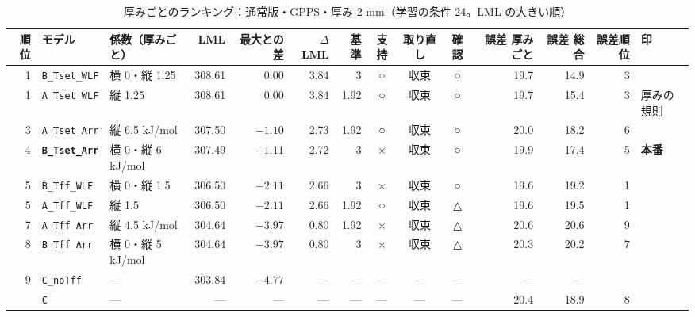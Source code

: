 \documentclass[paper=a4paper,landscape,fontsize=10pt,line_length=62zw,number_of_lines=34]{jlreq}
\let\origtextbf\textbf
\renewcommand{\textbf}[1]{\origtextbf{\gtfamily #1}}   %
\begin{document}
\begin{table}[H]\centering\footnotesize
\caption{厚みごとのランキング：通常版・GPPS・厚み 2 mm（学習の条件 24。LML の大きい順）}
\begin{tabular}{rlp{11\zw}rrrrccc rrrl}
\toprule
順位 & モデル & 係数（厚みごと） & LML & 最大との差 & $\Delta$LML & 基準 & 支持 & 取り直し & 確認 & 誤差 厚みごと & 誤差 総合 & 誤差順位 & 印 \\
\midrule
1 & \texttt{B\_\allowbreak{}Tset\_\allowbreak{}WLF} & 横 0・縦 1.25 & 308.61 & 0.00 & 3.84 & 3 & ○ & 収束 & ○ & 19.7 & 14.9 & 3 &  \\
1 & \texttt{A\_\allowbreak{}Tset\_\allowbreak{}WLF} & 縦 1.25 & 308.61 & 0.00 & 3.84 & 1.92 & ○ & 収束 & ○ & 19.7 & 15.4 & 3 & 厚みの規則 \\
3 & \texttt{A\_\allowbreak{}Tset\_\allowbreak{}Arr} & 縦 6.5 kJ/mol & 307.50 & $-1.10$ & 2.73 & 1.92 & ○ & 収束 & ○ & 20.0 & 18.2 & 6 &  \\
4 & \textbf{\texttt{B\_\allowbreak{}Tset\_\allowbreak{}Arr}} & 横 0・縦 6 kJ/mol & 307.49 & $-1.11$ & 2.72 & 3 & × & 収束 & ○ & 19.9 & 17.4 & 5 & \textbf{本番} \\
5 & \texttt{B\_\allowbreak{}Tff\_\allowbreak{}WLF} & 横 0・縦 1.5 & 306.50 & $-2.11$ & 2.66 & 3 & × & 収束 & ○ & 19.6 & 19.2 & 1 &  \\
5 & \texttt{A\_\allowbreak{}Tff\_\allowbreak{}WLF} & 縦 1.5 & 306.50 & $-2.11$ & 2.66 & 1.92 & ○ & 収束 & △ & 19.6 & 19.5 & 1 &  \\
7 & \texttt{A\_\allowbreak{}Tff\_\allowbreak{}Arr} & 縦 4.5 kJ/mol & 304.64 & $-3.97$ & 0.80 & 1.92 & × & 収束 & △ & 20.6 & 20.6 & 9 &  \\
8 & \texttt{B\_\allowbreak{}Tff\_\allowbreak{}Arr} & 横 0・縦 5 kJ/mol & 304.64 & $-3.97$ & 0.80 & 3 & × & 収束 & △ & 20.3 & 20.2 & 7 &  \\
9 & \texttt{C\_\allowbreak{}noTff} & --- & 303.84 & $-4.77$ & --- & --- & --- & --- & --- & --- & --- &  &  \\
 & \texttt{C} & --- & --- & --- & --- & --- & --- & --- & --- & 20.4 & 18.9 & 8 &  \\
\bottomrule
\end{tabular}
\end{table}
\end{document}
